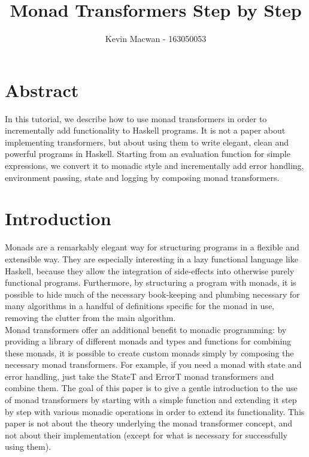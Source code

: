 \documentclass[a4paper,10pt]{article}
\title{Monad Transformers Step by Step}
\author{ Kevin Macwan - 163050053 }
\begin{document}
\maketitle

\section{Abstract}
In this tutorial, we describe how to use monad transformers in order to incrementally add
functionality to Haskell programs. It is not a paper about implementing transformers, but
about using them to write elegant, clean and powerful programs in Haskell. Starting from an
evaluation function for simple expressions, we convert it to monadic style and incrementally
add error handling, environment passing, state and logging by composing
monad transformers.
\newpage

\section{Introduction}
Monads are a remarkably elegant way for structuring programs in a flexible and extensible
way. They are especially interesting in a lazy functional language like Haskell, because they
allow the integration of side-effects into otherwise purely functional programs. Furthermore, by
structuring a program with monads, it is possible to hide much of the necessary book-keeping
and plumbing necessary for many algorithms in a handful of definitions specific for the monad
in use, removing the clutter from the main algorithm.\\
Monad transformers offer an additional benefit to monadic programming: by providing a
library of different monads and types and functions for combining these monads, it is possible
to create custom monads simply by composing the necessary monad transformers. For example,
if you need a monad with state and error handling, just take the StateT and ErrorT monad
transformers and combine them. The goal of this paper is to give a gentle introduction to the
use of monad transformers by starting with a simple function and extending it step by step with
various monadic operations in order to extend its functionality. This paper is not about the
theory underlying the monad transformer concept, and not about their implementation (except
for what is necessary for successfully using them).
\end{document}
